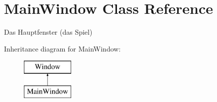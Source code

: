 \hypertarget{class_main_window}{}\section{Main\+Window Class Reference}
\label{class_main_window}


Das Hauptfenster (das Spiel)  


Inheritance diagram for Main\+Window\+:\begin{figure}[H]
\begin{center}
\leavevmode
\includegraphics[height=2.000000cm]{class_main_window}
\end{center}
\end{figure}
